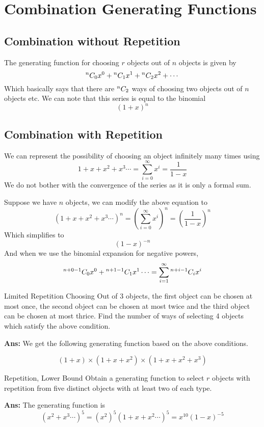 \section{Combination Generating Functions}

\subsection{Combination without Repetition}

The generating function for choosing \mbox{$r$} objects out of \mbox{$n$} objects is given by
\[
    {}^{n}C_{0}x^0 + {}^{n}C_{1}x^1 + {}^{n}C_{2}x^2 + \cdots
\]
Which basically says that there are \mbox{${}^{n}C_{2}$} ways of choosing two objects out of \mbox{$n$} objects etc.
We can note that this series is equal to the binomial
\[
    {(1+x)}^n
\]

\subsection{Combination with Repetition}
We can represent the possibility of choosing an object infinitely many times using
\[
    1+x+x^2+x^3\cdots = \sum_{i=0}^{\infty} x^i = \frac{1}{1-x}
\]
We do not bother with the convergence of the series as it is only a formal sum.

Suppose we have \mbox{$n$} objects, we can modify the above equation to
\[
    {(1+x+x^2+x^3\cdots)}^n = {(\sum_{i=0}^{\infty} x^i)}^n = {\left(\frac{1}{1-x}\right)}^n
\]
Which simplifies to
\[
    {(1-x)}^{-n}
\]
And when we use the binomial expansion for negative powers,
\[
    {}^{n+0-1}C_{0}x^0+{}^{n+1-1}C_{1}x^1\cdots = \sum_{i=1}^{\infty}{}^{n+i-1}C_{i}x^i
\]
\begin{exampletcb}{Limited Repetition Choosing}{}
    Out of 3 objects, the first object can be chosen at most once, the second object can be chosen at most twice and the third object can be chosen at most thrice. Find the number of ways of selecting 4 objects which satisfy the above condition.

    \textbf{Ans:} We get the following generating function based on the above conditions.

    \[
        (1+x) \times (1+x+x^2) \times (1+x+x^2+x^3)
    \]
\end{exampletcb}

\begin{exampletcb}{Repetition, Lower Bound}{}
    Obtain a generating function to select \mbox{$r$} objects with repetition from five distinct objects with at least two of each type.

    \textbf{Ans:} The generating function is
    \[
        {(x^2+x^3\cdots)}^5 = {(x^2)}^5 {(1+x+x^2\cdots)}^5 = x^{10} {(1-x)}^{-5}
    \]
\end{exampletcb}

